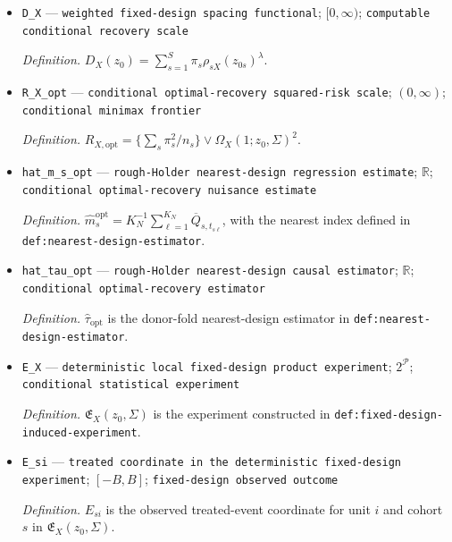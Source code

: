 \documentclass{article}
\begin{document}
\begin{itemize}
  \par\smallskip\noindent\emph{Definition.} \(\rho_{sX}(x)=\min_{1\le t\le T}\|X_{st}-x\|_2\).
  \item \texttt{D\_\allowbreak{}X} --- \texttt{weighted fixed-\allowbreak{}design spacing functional}; \([0,\infty)\); \texttt{computable conditional recovery scale}
  \par\smallskip\noindent\emph{Definition.} \(D_X(z_0)=\sum_{s=1}^{S}\pi_s\rho_{sX}(z_{0s})^\lambda\).
  \item \texttt{R\_\allowbreak{}X\_\allowbreak{}opt} --- \texttt{conditional optimal-\allowbreak{}recovery squared-\allowbreak{}risk scale}; \((0,\infty)\); \texttt{conditional minimax frontier}
  \par\smallskip\noindent\emph{Definition.} \(R_{X,\mathrm{opt}}=\{\sum_s\pi_s^2/n_s\}\vee\Omega_X(1;z_0,\Sigma)^2\).
  \item \texttt{hat\_\allowbreak{}m\_\allowbreak{}s\_\allowbreak{}opt} --- \texttt{rough-\allowbreak{}Holder nearest-\allowbreak{}design regression estimate}; \(\mathbb R\); \texttt{conditional optimal-\allowbreak{}recovery nuisance estimate}
  \par\smallskip\noindent\emph{Definition.} \(\widehat m_s^{\mathrm{opt}}=K_N^{-1}\sum_{\ell=1}^{K_N}\overline Q_{s,t_{s\ell}}\), with the nearest index defined in \texttt{def:nearest-design-estimator}.
  \item \texttt{hat\_\allowbreak{}tau\_\allowbreak{}opt} --- \texttt{rough-\allowbreak{}Holder nearest-\allowbreak{}design causal estimator}; \(\mathbb R\); \texttt{conditional optimal-\allowbreak{}recovery estimator}
  \par\smallskip\noindent\emph{Definition.} \(\widehat\tau_{\mathrm{opt}}\) is the donor-fold nearest-design estimator in \texttt{def:nearest-design-estimator}.
  \item \texttt{E\_\allowbreak{}X} --- \texttt{deterministic local fixed-\allowbreak{}design product experiment}; \(2^{\mathcal P}\); \texttt{conditional statistical experiment}
  \par\smallskip\noindent\emph{Definition.} \(\mathfrak E_X(z_0,\Sigma)\) is the experiment constructed in \texttt{def:fixed-design-induced-experiment}.
  \item \texttt{E\_\allowbreak{}si} --- \texttt{treated coordinate in the deterministic fixed-\allowbreak{}design experiment}; \([-B,B]\); \texttt{fixed-\allowbreak{}design observed outcome}
  \par\smallskip\noindent\emph{Definition.} \(E_{si}\) is the observed treated-event coordinate for unit \(i\) and cohort \(s\) in \(\mathfrak E_X(z_0,\Sigma)\).

\end{itemize}
\end{document}
